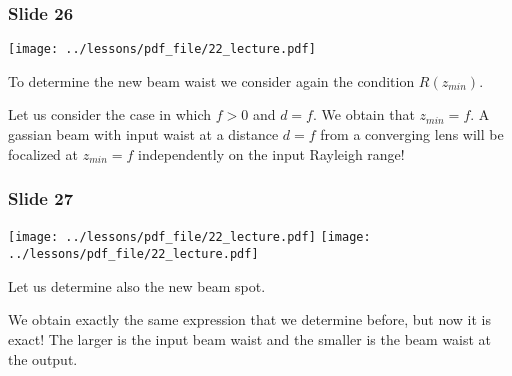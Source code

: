\documentclass[../main/main.tex]{subfiles}
\begin{document}
\subsubsection*{Slide 26}

\begin{minipage}[]{0.5\linewidth}
\centering
\texttt{[image: ../lessons/pdf\_file/22\_lecture.pdf]}
\end{minipage}
\hspace{0.3cm}\vspace{0.3cm}
\begin{minipage}[c]{0.47\linewidth}

To determine the new beam waist we consider again the condition \( R(z_{min}) \).

Let us consider the case in which \( f>0 \) and \( d = f \). We obtain that \( z_{min} = f \).
A gassian beam with input waist at a distance \( d=f \) from a converging lens will be focalized at \( z_{min} = f \) independently on the input Rayleigh range!

\end{minipage}

\subsubsection*{Slide 27}

\begin{minipage}[]{0.5\linewidth}
\centering
\texttt{[image: ../lessons/pdf\_file/22\_lecture.pdf]}
\texttt{[image: ../lessons/pdf\_file/22\_lecture.pdf]}
\end{minipage}
\hspace{0.3cm}\vspace{0.3cm}
\begin{minipage}[c]{0.47\linewidth}

Let us determine also the new beam spot.

We obtain exactly the same expression that we determine before, but now it is exact! The larger is the input beam waist and the smaller is the beam waist at the output.

\end{minipage}
\end{document}
